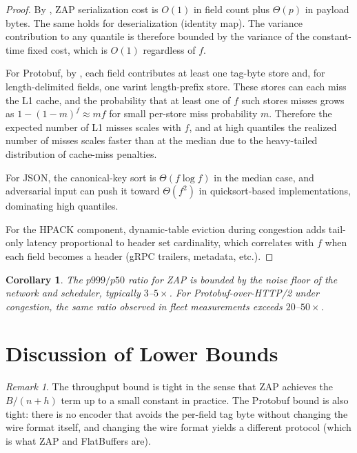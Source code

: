 \documentclass[11pt]{article}
\newtheorem{corollary}[theorem]{Corollary}
\theoremstyle{definition}
\theoremstyle{remark}
\newtheorem*{remark}{Remark}
\begin{document}
\begin{proof}
By , ZAP serialization cost is $O(1)$ in field
count plus $\Theta(p)$ in payload bytes. The same holds for
deserialization (identity map). The variance contribution to any
quantile is therefore bounded by the variance of the constant-time
fixed cost, which is $O(1)$ regardless of $f$.

For Protobuf, by , each field contributes at least
one tag-byte store and, for length-delimited fields, one varint
length-prefix store. These stores can each miss the L1 cache, and
the probability that at least one of $f$ such stores misses grows as
$1 - (1-m)^f \approx mf$ for small per-store miss probability $m$.
Therefore the expected number of L1 misses scales with $f$, and at
high quantiles the realized number of misses scales faster than at
the median due to the heavy-tailed distribution of cache-miss
penalties.

For JSON, the canonical-key sort is $\Theta(f \log f)$ in the median
case, and adversarial input can push it toward $\Theta(f^2)$ in
quicksort-based implementations, dominating high quantiles.

For the HPACK component, dynamic-table eviction during congestion
adds tail-only latency proportional to header set cardinality, which
correlates with $f$ when each field becomes a header (gRPC trailers,
metadata, etc.).
\end{proof}

\begin{corollary}
The $p999/p50$ ratio for ZAP is bounded by the noise floor of the
network and scheduler, typically $3$--$5\times$. For Protobuf-over-HTTP/2
under congestion, the same ratio observed in fleet measurements
exceeds $20$--$50\times$.
\end{corollary}

\section{Discussion of Lower Bounds}
\label{sec:lowerbounds}

\begin{remark}
The throughput bound  is tight in the sense that
ZAP achieves the $B/(n+h)$ term up to a small constant in practice.
The Protobuf bound is also tight: there is no encoder that avoids the
per-field tag byte without changing the wire format itself, and
changing the wire format yields a different protocol (which is
what ZAP and FlatBuffers are).
\end{remark}
\end{document}
